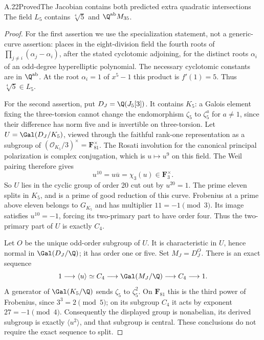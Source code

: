 \begin{statement}{A.22}{Proved}{The Jacobian contains both predicted extra quadratic intersections}
The field $L_5$ contains $\sqrt[4]5$ and $\Q^{\mathrm{ab}}M_{35}$.
\end{statement}
\begin{proof}
For the first assertion we use the specialization statement,
not a generic-curve assertion: \citet[Corollary 1.2(a)]{Yelton2019}
places in the eight-division field the fourth roots of
$\prod_{j\ne i}(\alpha_j-\alpha_i)$, after the stated cyclotomic
adjoining, for the distinct roots $\alpha_i$ of an odd-degree
hyperelliptic polynomial. The necessary cyclotomic constants
are in $\Q^{\mathrm{ab}}$. At the root $\alpha_i=1$ of
$x^5-1$ this product is $f'(1)=5$. Thus
$\sqrt[4]5\in L_5$.

For the second assertion, put $D_J=\Q(J_5[3])$.
It contains $K_5$: a Galois element fixing the three-torsion
cannot change the endomorphism $\zeta_5$ to $\zeta_5^a$ for
$a\ne1$, since their difference has norm five and is invertible
on three-torsion. Let $U=\Gal(D_J/K_5)$, viewed through the
faithful rank-one representation as a subgroup of
$(\mathcal O_{K_5}/3)^\times=\mathbf F_{81}^\times$.
The Rosati involution for the canonical principal polarization
is complex conjugation, which is $u\mapsto u^9$ on this field.
The Weil pairing therefore gives
\[
                 u^{10}=u\overline u=\chi_3(u)\in\mathbf F_3^\times.
\]
So $U$ lies in the cyclic group of order 20 cut out by $u^{20}=1$.
The prime eleven splits in $K_5$, and is a prime of good reduction
of this curve. Frobenius at a prime above eleven belongs to
$G_{K_5}$ and has multiplier $11=-1\pmod3$. Its image satisfies
$u^{10}=-1$, forcing its two-primary part to have order four.
Thus the two-primary part of $U$ is exactly $C_4$.

Let $O$ be the unique odd-order subgroup of $U$. It is
characteristic in $U$, hence normal in $\Gal(D_J/\Q)$; it has
order one or five. Set $M_J=D_J^O$. There is an exact sequence
\[
  1\longrightarrow\langle u\rangle\simeq C_4
   \longrightarrow\Gal(M_J/\Q)\longrightarrow C_4
   \longrightarrow1.
\]
A generator of $\Gal(K_5/\Q)$ sends $\zeta_5$ to $\zeta_5^2$.
On $\mathbf F_{81}$ this is the third power of Frobenius, since
$3^3=2\pmod5$; on its subgroup $C_4$ it acts by exponent
$27=-1\pmod4$. Consequently the displayed group is nonabelian,
its derived subgroup is exactly $\langle u^2\rangle$, and that
subgroup is central. These conclusions do not require the exact
sequence to split.


\end{proof}
